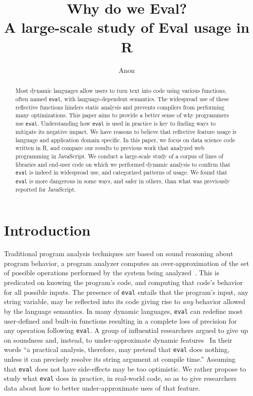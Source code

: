 \documentclass[USenglish,cleveref, autoref, thm-restate]{lipics-v2019}
\title{Why do we Eval?\\[2mm]\Large
A large-scale study of Eval usage in R}
\author{Anon}{Under review}{}{}{}
\newcommand{\eval}{\texttt{eval}\xspace}
\begin{document}
\maketitle

\begin{abstract}
  \noindent Most dynamic languages allow users to turn text into code
  using various functions, often named \eval, with language-dependent
  semantics. The widespread use of these reflective functions hinders
  static analysis and prevents compilers from performing many
  optimizations. This paper aims to provide a better sense of why
  programmers use \eval.  Understanding how \eval is used in practice
  is key to finding ways to mitigate its negative impact. We have
  reasons to believe that reflective feature usage is language and
  application domain specific. In this paper, we focus on data science
  code written in R, and compare our results to previous work that
  analyzed web programming in JavaScript.  We conduct a large-scale
  study of a corpus of \CorpusAllCodeRnd lines of libraries and
  end-user code on which we performed dynamic analysis to confirm that
  \eval is indeed in widespread use, and categorized patterns of
  usage. We found that \eval is more dangerous in some ways, and safer
  in others, than what was previously reported for JavaScript.
\end{abstract}


\section{Introduction}

Traditional program analysis techniques are based on sound reasoning about
program behavior, a program analyzer computes an over-approximation of the
set of possible operations performed by the system being
analyzed~\cite{cc77}.  This is predicated on knowing the program's code, and
computing that code's behavior for all possible inputs. The presence of
\eval entails that the program's input, any string variable, may be
reflected into its code giving rise to \emph{any} behavior allowed by the
language semantics. In many dynamic languages, \eval can redefine most
user-defined and built-in functions resulting in a complete loss of
precision for any operation following \eval. A group of influential
researchers argued to give up on soundness and, instead, to
under-approximate dynamic features~\cite{soundy} In their words ``a
practical analysis, therefore, may pretend that \eval does nothing, unless
it can precisely resolve its string argument at compile time.''  Assuming
that \eval does not have side-effects may be too optimistic. We rather
propose to study what \eval does in practice, in real-world code, so as to
give researchers data about how to better under-approximate uses of that
feature.
\end{document}
